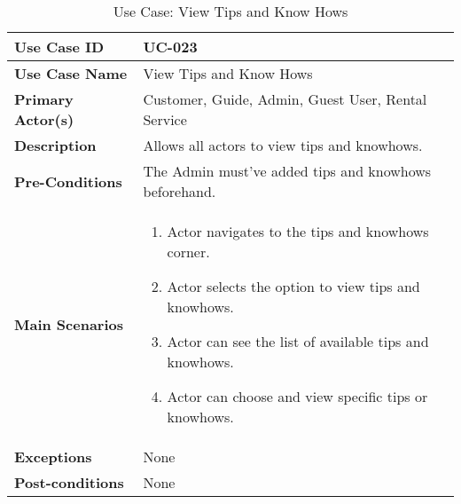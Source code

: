 \begin{table}[ht]
    \centering
    \begin{tabular}{|l|p{}|}
        \hline
        \textbf{Use Case ID} & UC-023 \\
        \hline
        \textbf{Use Case Name} & View Tips and Know Hows \\
        \hline
        \textbf{Primary Actor(s)} & Customer, Guide, Admin, Guest User, Rental Service \\
        \hline
        \textbf{Description} & Allows all actors to view tips and knowhows. \\
        \hline
        \textbf{Pre-Conditions} & The Admin must've added tips and knowhows beforehand. \\
        \hline
        \textbf{Main Scenarios} & 
        \begin{enumerate}[label=\arabic*.,itemsep=0pt]
            \item Actor navigates to the tips and knowhows corner.
            \item Actor selects the option to view tips and knowhows.
            \item Actor can see the list of available tips and knowhows.
            \item Actor can choose and view specific tips or knowhows.
        \end{enumerate} \\
        \hline
        \textbf{Exceptions} & None \\
        \hline
        \textbf{Post-conditions} & None \\
        \hline
    \end{tabular}
    \label{tab:use-case-view-tips-know-hows}
    \caption{Use Case: View Tips and Know Hows}
\end{table}

